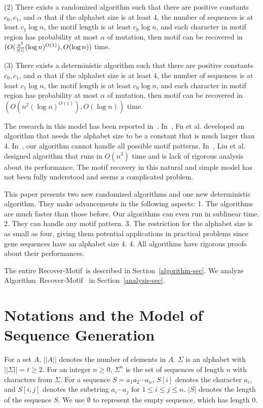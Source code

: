 \documentclass[11pt]{article}
\newcommand{\algmnam}{Recover-Motif}
\newcommand{\algmname}{Algorithm~\algmnam}
\newcommand{\algma}{\algmname~}
\begin{document}
(2) There exists a randomized algorithm such that there are positive
constants $c_0, c_1$, and $\alpha$ that if the alphabet size is at
least $4$, the number of sequences is at least $c_1\log n$, the
motif length is at least $c_0\log n$, and each character in motif
region has probability at most $\alpha$ of mutation, then motif can
be recovered in $(O({n^2\over |G|}(\log n)^{O(1)}), O(\log n))$
time.

(3) There exists a deterministic algorithm such that there are
positive constants $c_0, c_1$, and $\alpha$ that if the alphabet
size is at least $4$, the number of sequences is at least $c_1\log
n$, the motif length is at least $c_0\log n$, and each character in
motif region has probability at most $\alpha$ of mutation, then
motif can be recovered in $(O({n^2}(\log n)^{O(1)}), O(\log n))$
time.

The research in this model has been reported
in~\cite{FuKaoWang09b,FuKaoWang08b,LiuMaWang08}.
In~\cite{FuKaoWang09b}, Fu et al. developed an algorithm that needs
the alphabet size to be a constant that is much larger than 4.
In~\cite{FuKaoWang08b}, our algorithm cannot handle all possible
motif patterns. In~\cite{LiuMaWang08}, Liu et al. designed algorithm
that runs in $O(n^3)$ time and is lack of rigorous analysis about
its performance. The motif recovery in this natural and simple model
has not been fully understood and seems a complicated problem.

This paper presents two new randomized algorithms and one new
deterministic algorithm. They make advancements in the following
aspects: 1. The algorithms are much faster than those before. Our
algorithms can even run in sublinear time. 2. They can handle any
motif pattern. 3. The restriction for the alphabet size is as small
as four, giving them potential applications in practical problems
since gene sequences have an alphabet size $4$. 4. All algorithms
have rigorous proofs about their performances.

The entire \algmnam~is described in
Section~\ref{algorithm-sec}. We analyze \algma
in Section~\ref{analysis-sec}.


\section{Notations and the Model of Sequence Generation}\label{notation-sec}
For a set $A$, $||A||$ denotes the number of elements in $A$.
$\Sigma$ is an alphabet with $||\Sigma||=t\ge 2$. For an integer
$n\ge 0$, $\Sigma^n$ is the set of sequences of length $n$ with
characters from $\Sigma$. For a sequence $S=a_1a_2\cdots a_n$,
$S[i]$ denotes the character $a_i$, and $S[i,j]$ denotes the
substring $a_i\cdots a_{j}$ for $1\le i\le j\le n$. $|S|$ denotes
the length of the sequence $S$.
We use $\emptyset$ to represent the empty sequence, which has length
$0$.
\end{document}
